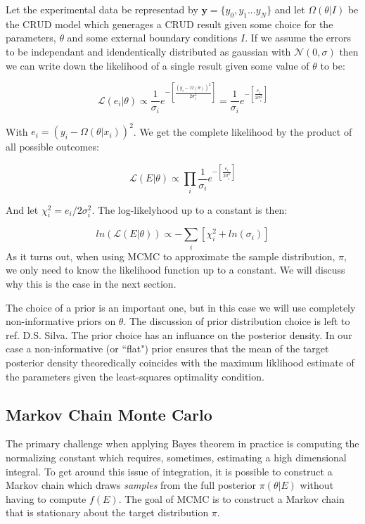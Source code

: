 \documentclass[10pt,a4paper]{report}
\begin{document}
Let the experimental data be representad by $\mathbf y =\{y_0, y_1... y_N\}$ and let $\Omega(\theta|I)$ be the CRUD model which generages a CRUD result given some choice for the parameters, $\theta$ and some external boundary conditions $I$.
If we assume the errors to be independant and idendentically distributed as gaussian with $\mathcal N(0, \sigma) $ then we can write down the likelihood of a single result given some value of $\theta$ to be:

\begin{equation}
\mathcal L (e_i|\theta) \propto  \frac{1}{\sigma_i}  e^{-\left[ \frac{(y_i - \Omega(\theta))^2}{2\sigma_i^2} \right]} =  \frac{1}{\sigma_i}  e^{-\left[ \frac{e_i}{2\sigma_i^2} \right]}
\end{equation}

With $e_i = (y_i - \Omega(\theta|x_i))^2$.
We get the complete likelihood by the product of all possible outcomes:

\begin{equation}
\mathcal L (E|\theta) \propto \prod_i \frac{1}{\sigma_i}  e^{-\left[ \frac{e_i}{2\sigma_i^2} \right]}
\end{equation}

And let $\chi_i^2 = e_i / 2\sigma_i^2$.  The log-likelyhood up to a constant is then:

\begin{equation}
ln(\mathcal L (E|\theta)) \propto -  \sum_i \left[ \chi_i^2 + ln(\sigma_i) \right]
\end{equation}
As it turns out, when using MCMC to approximate the sample distribution, $\pi$, we only need to know the likelihood function up to a constant.  We will discuss why this is the case in the next section.

The choice of a prior is an important one, but in this case we will use completely non-informative priors on $\theta$.  The discussion of prior distribution choice is left to ref. D.S. Silva.  The prior choice has an influance on the posterior density.  In our case a non-informative (or ``flat") prior ensures that the mean of the target posterior density theoredically coincides with the maximum liklihood estimate of the parameters given the least-squares optimality condition.

\subsection{Markov Chain Monte Carlo}

The primary challenge when applying Bayes theorem in practice is computing the normalizing constant which requires, sometimes, estimating a high dimensional integral.   To get around this issue of integration, it is possible to construct a Markov chain which draws \emph{samples} from the full posterior $\pi(\theta|E)$ without having to compute $f(E)$.    The goal of MCMC is to construct a Markov chain that is stationary about the target distribution $\pi$.
\end{document}
